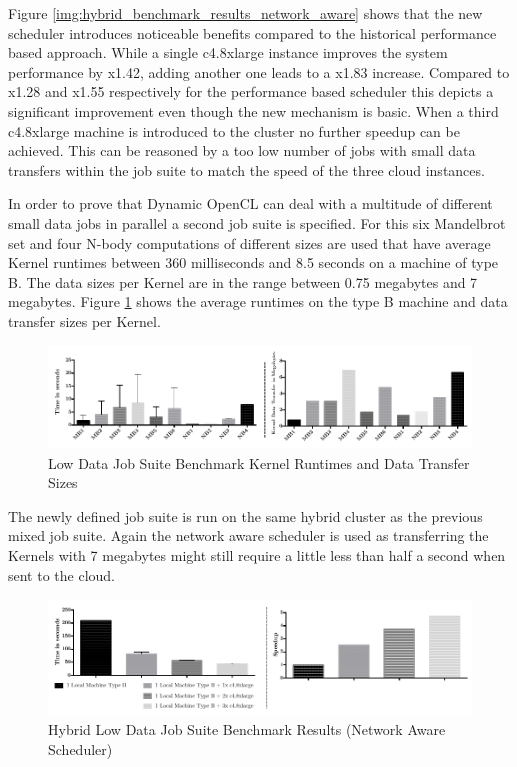 Figure \ref{img:hybrid_benchmark_results_network_aware} shows that the new scheduler introduces noticeable benefits compared to the historical performance based approach. While a single c4.8xlarge instance improves the system performance by x1.42, adding another one leads to a x1.83 increase. Compared to x1.28 and x1.55 respectively for the performance based scheduler this depicts a significant improvement even though the new mechanism is basic. When a third c4.8xlarge machine is introduced to the cluster no further speedup can be achieved. This can be reasoned by a too low number of jobs with small data transfers within the job suite to match the speed of the three cloud instances.

In order to prove that Dynamic OpenCL can deal with a multitude of different small data jobs in parallel a second job suite is specified. For this six Mandelbrot set and four N-body computations of different sizes are used that have average Kernel runtimes between 360 milliseconds and 8.5 seconds on a machine of type B. The data sizes per Kernel are in the range between 0.75 megabytes and 7 megabytes. Figure \ref{img:low_data_benchmark_statistics} shows the average runtimes on the type B machine and data transfer sizes per Kernel.

\begin{figure}[H]	
	\includegraphics[width=1.0\textwidth]{images/lowdata_benchmark_statistics.pdf}
	\centering
	\caption{Low Data Job Suite Benchmark Kernel Runtimes and Data Transfer Sizes}
	\label{img:low_data_benchmark_statistics}
\end{figure}

The newly defined job suite is run on the same hybrid cluster as the previous mixed job suite. Again the network aware scheduler is used as transferring the Kernels with 7 megabytes might still require a little less than half a second when sent to the cloud.

\begin{figure}[H]	
	\includegraphics[width=1.0\textwidth]{images/hybrid_lowdata_benchmark.pdf}
	\centering
	\caption{Hybrid Low Data Job Suite Benchmark Results (Network Aware Scheduler)}
	\label{img:hybrid_low_data_benchmark_results_network_aware}
\end{figure}

